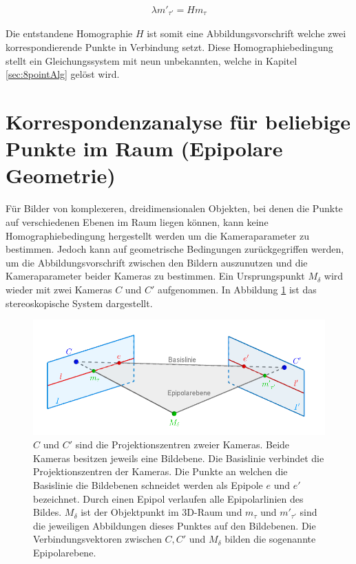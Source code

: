 \begin{gather}
	\lambda m'_{\tau'} = H m_\tau\label{eq:H}
\end{gather} 


Die entstandene Homographie $H$ ist somit eine Abbildungsvorschrift welche zwei korrespondierende Punkte in Verbindung setzt. %
Diese Homographiebedingung stellt ein Gleichungssystem mit neun unbekannten, welche in Kapitel \ref{sec:8pointAlg} gelöst wird\cite{HZ}.



\section{Korrespondenzanalyse für beliebige Punkte im Raum (Epipolare Geometrie)}
\label{sec:EpiolarContraints}

Für Bilder von komplexeren, dreidimensionalen Objekten, bei denen die Punkte auf verschiedenen Ebenen im Raum liegen können, kann keine Homographiebedingung hergestellt werden um die Kameraparameter zu bestimmen. Jedoch kann auf geometrische Bedingungen zurückgegriffen werden, um die Abbildungsvorschrift zwischen den Bildern auszunutzen und die Kameraparameter beider Kameras zu bestimmen. Ein Ursprungspunkt $M_\delta$ wird wieder mit zwei Kameras $C$ und $C'$ aufgenommen. In Abbildung \ref{fig:Epipolargeometry} ist das stereoskopische System dargestellt.
\pagebreak


\begin{figure}[!htb]
	\centering
	\includegraphics[width=.8\linewidth]{images/EpipolarGeoemtrieGrafik_beschriftet.png}
	\caption[Epipolar Geometrie]{$C$ und $C'$ sind die Projektionszentren zweier Kameras. Beide Kameras besitzen jeweils eine Bildebene. Die Basislinie verbindet die Projektionszentren der Kameras. Die Punkte an welchen die Basislinie die Bildebenen schneidet werden als Epipole $e$ und $e'$ bezeichnet. Durch einen Epipol verlaufen alle Epipolarlinien des Bildes. $M_\delta$ ist der Objektpunkt im 3D-Raum und $m_\tau$ und $m'_{\tau'}$ sind die jeweiligen Abbildungen dieses Punktes auf den Bildebenen. Die Verbindungsvektoren zwischen $C, C'$ und $M_\delta$ bilden die sogenannte Epipolarebene\cite{Hoffmann,phdTwoView,HZ,ZZGXr}.}  
	\label{fig:Epipolargeometry}
\end{figure}



